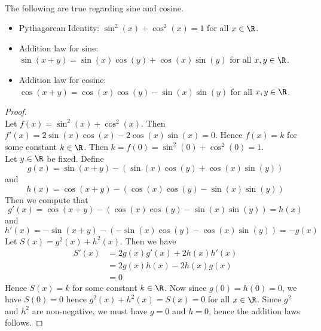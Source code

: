 \documentclass[a4paper]{article}
\begin{document}
\begin{lmm}{}{}\\
The following are true regarding sine and cosine. 
\begin{itemize}
\item Pythagorean Identity: $\sin^2(x)+\cos^2(x)=1$ for all $x\in\R$. 
\item Addition law for sine: $\sin(x+y)=\sin(x)\cos(y)+\cos(x)\sin(y)$ for all $x,y\in\R$. 
\item Addition law for cosine: $\cos(x+y)=\cos(x)\cos(y)-\sin(x)\sin(y)$ for all $x,y\in\R$. 
\end{itemize}
\begin{proof}\\
Let $f(x)=\sin^2(x)+\cos^2(x)$. Then $f'(x)=2\sin(x)\cos(x)-2\cos(x)\sin(x)=0$. Hence $f(x)=k$ for some constant $k\in\R$. Then $k=f(0)=\sin^2(0)+\cos^2(0)=1$. \\

Let $y\in\R$ be fixed. Define $$g(x)=\sin(x+y)-\left(\sin(x)\cos(y)+\cos(x)\sin(y)\right)$$ and $$h(x)=\cos(x+y)-\left(\cos(x)\cos(y)-\sin(x)\sin(y)\right)$$ Then we compute that $$g'(x)=\cos(x+y)-\left(\cos(x)\cos(y)-\sin(x)\sin(y)\right)=h(x)$$ and $$h'(x)=-\sin(x+y)-\left(-\sin(x)\cos(y)-\cos(x)\sin(y)\right)=-g(x)$$ Let $S(x)=g^2(x)+h^2(x)$. Then we have 
\begin{align*}
S'(x)&=2g(x)g'(x)+2h(x)h'(x)\\
&=2g(x)h(x)-2h(x)g(x)\\
&=0
\end{align*}
Hence $S(x)=k$ for some constant $k\in\R$. Now since $g(0)=h(0)=0$, we have $S(0)=0$ hence $g^2(x)+h^2(x)=S(x)=0$ for all $x\in\R$. Since $g^2$ and $h^2$ are non-negative, we must have $g=0$ and $h=0$, hence the addition laws follows. 
\end{proof}
\end{lmm}
\end{document}
